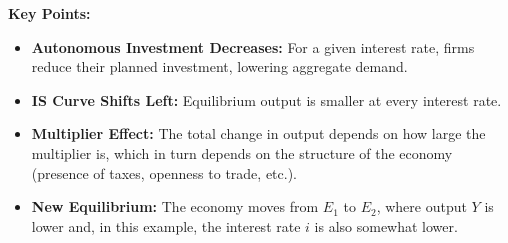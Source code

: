 \noindent
\textbf{Key Points:}
\begin{itemize}
    \item \textbf{Autonomous Investment Decreases:} For a given interest rate, firms reduce their planned investment, lowering aggregate demand.
    \item \textbf{IS Curve Shifts Left:} Equilibrium output is smaller at every interest rate.
    \item \textbf{Multiplier Effect:} The total change in output depends on how large the multiplier is, which in turn depends on the structure of the economy (presence of taxes, openness to trade, etc.).
    \item \textbf{New Equilibrium:} The economy moves from \(E_1\) to \(E_2\), where output \(Y\) is lower and, in this example, the interest rate \(i\) is also somewhat lower.
\end{itemize}

